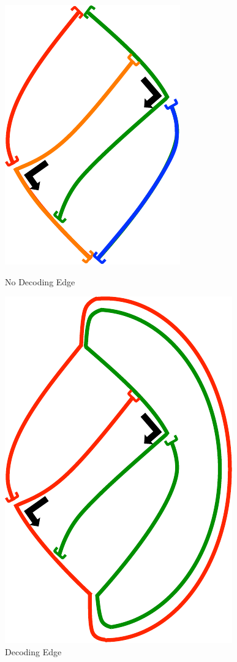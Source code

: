 \begin{figure}[!ht]
\begin{minipage}[b]{0.47\linewidth}
\centering
\includegraphics[scale=1]{ncs_no_decode.pdf}
\caption{No Decoding Edge}
\label{fig:ncs_no_decode}
\end{minipage}
\hfill
\begin{minipage}[b]{0.47\linewidth}
\centering
\includegraphics[scale=1]{ncs_decode.pdf}
\caption{Decoding Edge}
\label{fig:ncs_decode}
\end{minipage}
\end{figure}

